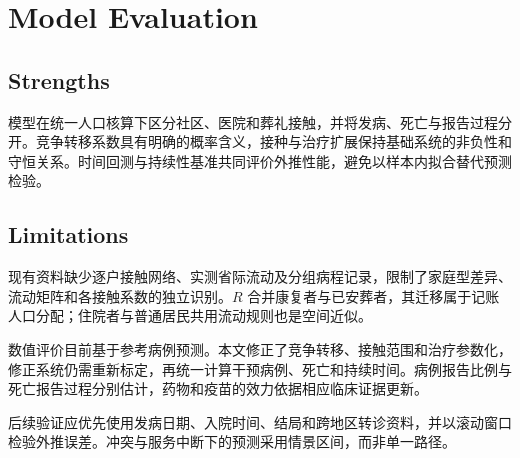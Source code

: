 \section{Model Evaluation}
\label{sec:evaluation}

\subsection{Strengths}

模型在统一人口核算下区分社区、医院和葬礼接触，并将发病、死亡与报告过程分开。竞争转移系数具有明确的概率含义，接种与治疗扩展保持基础系统的非负性和守恒关系。时间回测与持续性基准共同评价外推性能，避免以样本内拟合替代预测检验。

\subsection{Limitations}

现有资料缺少逐户接触网络、实测省际流动及分组病程记录，限制了家庭型差异、流动矩阵和各接触系数的独立识别。$R$ 合并康复者与已安葬者，其迁移属于记账人口分配；住院者与普通居民共用流动规则也是空间近似。

数值评价目前基于参考病例预测。本文修正了竞争转移、接触范围和治疗参数化，修正系统仍需重新标定，再统一计算干预病例、死亡和持续时间。病例报告比例与死亡报告过程分别估计，药物和疫苗的效力依据相应临床证据更新。

后续验证应优先使用发病日期、入院时间、结局和跨地区转诊资料，并以滚动窗口检验外推误差。冲突与服务中断下的预测采用情景区间，而非单一路径。
